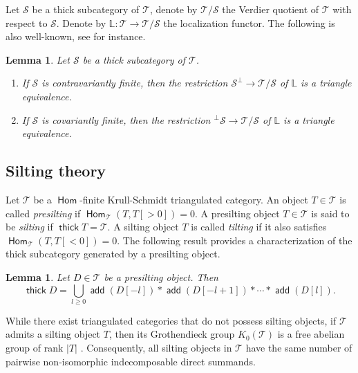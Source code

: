 \documentclass[12pt,a4paper,reqno]{amsart}
\newtheorem{lemma}[theorem]{Lemma}
\theoremstyle{definition}
\newcommand{\opname}[1]{\operatorname{\mathsf{#1}}}
\newcommand{\add}{\opname{add}\nolimits}
\newcommand{\thick}{\opname{thick}}
\newcommand{\Hom}{\opname{Hom}}
\begin{document}
Let $\mathcal{S}$ be a thick subcategory  of $\mathcal{T}$, denote by $\mathcal{T}/\mathcal{S}$ the Verdier quotient of $\mathcal{T}$ with respect to $\mathcal{S}$. Denote by $\mathbb{L}: \mathcal{T}\to \mathcal{T}/\mathcal{S}$ the localization functor. The following  is also well-known, see \cite[Lemma 2.2]{DF} for instance.



\begin{lemma}\label{l:perp-quotient}
Let $\mathcal{S}$ be a thick subcategory of $\mathcal{T}$.
\begin{enumerate}
\item If $\mathcal{S}$ is contravariantly finite, then the restriction $\mathcal{S}^\perp\to \mathcal{T}/\mathcal{S}$ of $\mathbb{L}$ is a triangle equivalence.
\item If  $\mathcal{S}$ is covariantly finite, then the restriction $^\perp\mathcal{S}\to \mathcal{T}/\mathcal{S}$ of $\mathbb{L}$ is a triangle equivalence.
\end{enumerate}
\end{lemma}


\subsection{Silting theory} Let $\mathcal{T}$ be a $\Hom$-finite Krull-Schmidt triangulated category. 
An object $T\in \mathcal{T}$ is  called  {\em presilting}  if $\Hom_{\mathcal{T}}(T,T[>0])=0$.
A presilting object $T\in \mathcal{T}$ is said to be {\em silting} if $\thick T=\mathcal{T}$. A silting object $T$ is called \emph{tilting} if it also satisfies $\Hom_{\mathcal{T}}(T,T[<0])=0$. The following result provides a characterization of the thick subcategory generated by a presilting object.
\begin{lemma}\cite[Proposition 2.17]{AiharaIyama}\label{lem:thick-subcat-as-extension}
    Let $D\in \mathcal{T}$ be a presilting object. Then 
    \[
    \thick D=\bigcup\limits_{l \geq 0} \add (D[-l]) * \add (D[-l + 1]) * \cdots * \add (D[l]).
    \]
\end{lemma}
While there exist triangulated categories that do not possess silting objects, if $\mathcal{T}$ admits a silting object $T$, then its Grothendieck group $K_0(\mathcal{T})$ is a free abelian group of rank $|T|$ \cite[Theorem 2.27]{AiharaIyama}. Consequently, all silting objects in $\mathcal{T}$ have the same number of pairwise non-isomorphic indecomposable direct summands.
\end{document}
